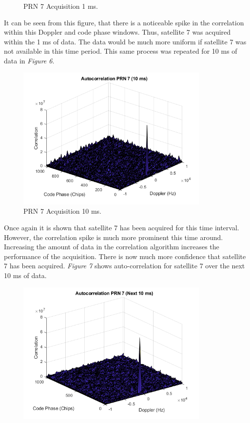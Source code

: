 \documentclass[11pt]{article}
\begin{document}
\begin{enumerate}[label=\textbf{\arabic*.}]
\begin{figure}[H]
        \caption{PRN 7 Acquisition 1 ms.}
    \end{figure}
It can be seen from this figure, that there is a noticeable spike in the correlation within this Doppler and code phase windows. Thus, satellite 7 was acquired within the 1 ms of data. The data would be much more uniform if satellite 7 was not available in this time period. This same process was repeated for 10 ms of data in \emph{Figure 6}.
    \begin{figure}[H]
        \centering
        \includegraphics[width=0.85\textwidth]{Lab_4_PRN7_10ms.png}
        \caption{PRN 7 Acquisition 10 ms.}
    \end{figure}
Once again it is shown that satellite 7 has been acquired for this time interval. However, the correlation spike is much more prominent this time around. Increasing the amount of data in the correlation algorithm increases the performance of the acquisition. There is now much more confidence that satellite 7 has been acquired. \emph{Figure 7} shows auto-correlation for satellite 7 over the next 10 ms of data.
    \begin{figure}[H]
        \centering
        \includegraphics[width=0.85\textwidth]{Lab_4_PRN7_20ms.png}

\end{figure}
\end{enumerate}
\end{document}
